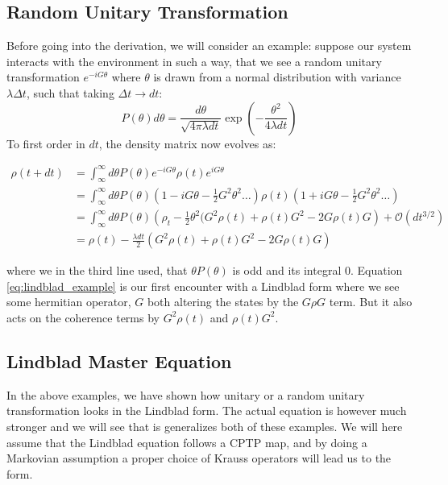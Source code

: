 \subsection{Random Unitary Transformation} \label{sec:random_unitary_transformation}
Before going into the derivation, we will consider an example: suppose our system interacts with the environment in such a way, that we see a random unitary transformation $e^{-iG\theta}$ where $\theta$ is drawn from a normal distribution with variance $\lambda \Delta t$, such that taking $\Delta t \to dt$:
\begin{equation}
    P(\theta) d\theta = \frac{d\theta}{\sqrt{4\pi\lambda dt}}\exp(-\frac{\theta^2}{4\lambda dt})
\end{equation}
To first order in $dt$, the density matrix now evolves as:
\begin{fullwidth}
\begin{align}
    \rho(t+dt)  &= \int_\infty^\infty d\theta P(\theta) e^{-iG\theta}\rho(t)e^{iG\theta}  \nonumber \\
                &= \int_\infty^\infty d\theta P(\theta) (1 - iG\theta  - \frac12 G^2\theta^2 \dots)\rho(t) (1 + iG\theta - \frac12 G^2\theta^2 \dots)  \nonumber \\
                &= \int_\infty^\infty d\theta P(\theta) \left(\rho_t - \frac12\theta^2(G^2\rho(t) + \rho(t)G^2 - 2 G\rho(t) G\right) + \mathcal{O}(dt^{3/2}) \nonumber \\
                &= \rho(t) - \frac{\lambda dt}{2} \left(G^2\rho(t) + \rho(t)G^2 - 2 G\rho(t) G\right) \label{eq:lindblad_example}
\end{align}
\end{fullwidth}
where we in the third line used, that $\theta P(\theta)$ is odd and its integral $0$. Equation \ref{eq:lindblad_example} is our first encounter with a Lindblad form where we see some hermitian operator, $G$ both altering the states by the $G\rho G$ term. But it also acts on the coherence terms by $G^2\rho(t)$ and $\rho(t) G^2$. \cite{pearle_simple_2012}

\subsection{Lindblad Master Equation}
In the above examples, we have shown how unitary or a random unitary transformation looks in the Lindblad form. The actual equation is however much stronger and we will see that is generalizes both of these examples. We will here assume that the Lindblad equation follows a CPTP map, and by doing a Markovian assumption a proper choice of Krauss operators will lead us to the form.


